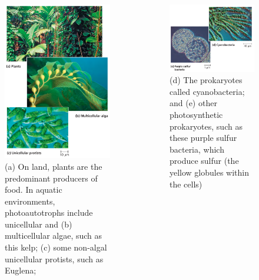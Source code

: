 \documentclass[ignorenonframetext,aspectratio=169]{beamer}
\begin{document}
\begin{frame}{}
\protect\hypertarget{section-21}{}

\begin{columns}[T,onlytextwidth]

\begin{figure}
\includegraphics[width=0.5\linewidth]{./../images/photoautotrophs2} \caption{(a) On land, plants are the predominant producers of food. In aquatic environments, photoautotrophs include unicellular and (b) multicellular algae, such as this kelp; (c) some non-algal unicellular protists, such as Euglena;}\label{fig:photoautotrophs}
\end{figure}


\begin{figure}
\includegraphics[width=0.5\linewidth]{./../images/photoautotrophs} \caption{(d) The prokaryotes called cyanobacteria; and (e) other photosynthetic prokaryotes, such as these purple sulfur bacteria, which produce sulfur (the yellow globules within the cells)}\label{fig:photoautotrophs2}
\end{figure}

\end{columns}

\end{frame}
\end{document}
